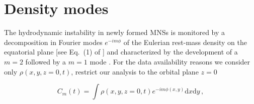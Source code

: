 \section{Density modes} \label{sec:bns_sims:method:modes}


The hydrodynamic instability in newly formed \acp{MNS} 
is monitored by a decomposition in Fourier modes
$e^{- i m \phi}$ of the Eulerian rest-mass density on the equatorial plane 
[see Eq.~(1) of \citep{Radice:2016gym}] and characterized by the
development of a $m=2$ followed by a $m=1$ mode 
\citep{East:2015vix,Paschalidis:2015mla,Radice:2016gym,Lehner:2016wjg,Bernuzzi:2013rza,Kastaun:2014fna}.
%
%
%
%
For the data availability reasons we consider only $\rho(x,y,z=0,t)$, 
\ie restrict our analysis to the orbital plane $z=0$

\begin{equation}
\label{eq:modes}
C_m(t) = \int \rho(x,y,z=0,t) e^{-i m \phi(x,y)} \text{d}x \text{d} y \, ,
\end{equation}

